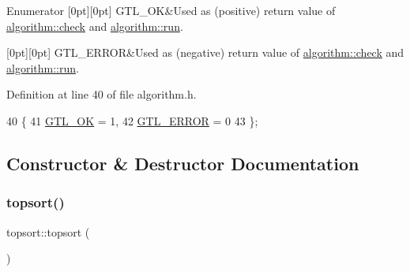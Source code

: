 \begin{DoxyEnumFields}{Enumerator}
[0pt][0pt]{}\mbox{\label{classalgorithm_af1a0078e153aa99c24f9bdf0d97f6710a5114c20e4a96a76b5de9f28bf15e282b}} 
G\+T\+L\+\_\+\+OK&Used as (positive) return value of \mbox{\hyperlink{classalgorithm_a76361fb03ad1cf643affc51821e43bed}{algorithm\+::check}} and \mbox{\hyperlink{classalgorithm_a734b189509a8d6b56b65f8ff772d43ca}{algorithm\+::run}}. \\
\hline

[0pt][0pt]{}\mbox{\label{classalgorithm_af1a0078e153aa99c24f9bdf0d97f6710a6fcf574690bbd6cf710837a169510dd7}} 
G\+T\+L\+\_\+\+E\+R\+R\+OR&Used as (negative) return value of \mbox{\hyperlink{classalgorithm_a76361fb03ad1cf643affc51821e43bed}{algorithm\+::check}} and \mbox{\hyperlink{classalgorithm_a734b189509a8d6b56b65f8ff772d43ca}{algorithm\+::run}}. \\
\hline

\end{DoxyEnumFields}


Definition at line 40 of file algorithm.\+h.


\begin{DoxyCode}
40          \{
41     \mbox{\hyperlink{classalgorithm_af1a0078e153aa99c24f9bdf0d97f6710a5114c20e4a96a76b5de9f28bf15e282b}{GTL\_OK}} = 1,
42     \mbox{\hyperlink{classalgorithm_af1a0078e153aa99c24f9bdf0d97f6710a6fcf574690bbd6cf710837a169510dd7}{GTL\_ERROR}} = 0
43     \};
\end{DoxyCode}


\subsection{Constructor \& Destructor Documentation}
\mbox{\label{classtopsort_a76a9055969b9dbf006320040be9fd5e6}} 
\subsubsection{\texorpdfstring{topsort()}{topsort()}}
{\footnotesize\ttfamily topsort\+::topsort (\begin{DoxyParamCaption}{ }\end{DoxyParamCaption})\hspace{0.3cm}{\ttfamily [inline]}}

